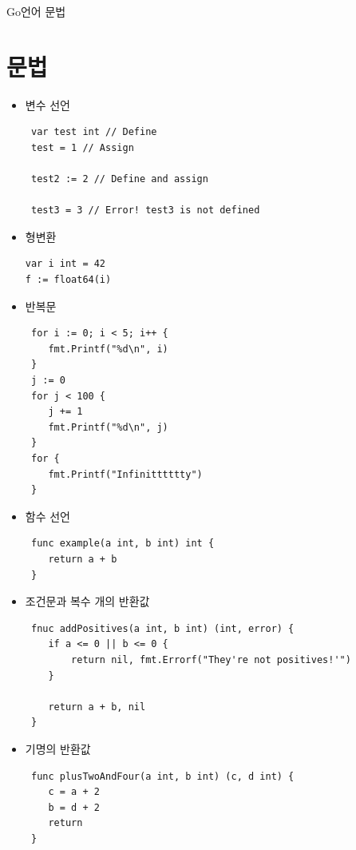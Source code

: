\documentclass{beamer}
\begin{document}
 \begin{frame}{Go언어 문법}
 \section{문법}
  \begin{itemize}
  \item 변수 선언
\begin{lstlisting}
 var test int // Define
 test = 1 // Assign

 test2 := 2 // Define and assign

 test3 = 3 // Error! test3 is not defined
\end{lstlisting}

    \item 형변환

    \begin{lstlisting}
var i int = 42
f := float64(i)
    \end{lstlisting}

    \framebreak

    \item 반복문
\begin{lstlisting}
 for i := 0; i < 5; i++ {
    fmt.Printf("%d\n", i)
 }
 j := 0
 for j < 100 {
    j += 1
    fmt.Printf("%d\n", j)
 }
 for {
    fmt.Printf("Infinitttttty")
 }
\end{lstlisting}

\framebreak

   \item 함수 선언
\begin{lstlisting}
 func example(a int, b int) int {
    return a + b
 }
\end{lstlisting}

    \item 조건문과 복수 개의 반환값
\begin{lstlisting}
 fnuc addPositives(a int, b int) (int, error) {
    if a <= 0 || b <= 0 {
        return nil, fmt.Errorf("They're not positives!'")
    }

    return a + b, nil
 }
\end{lstlisting}

    \framebreak

    \item 기명의 반환값

\begin{lstlisting}
 func plusTwoAndFour(a int, b int) (c, d int) {
    c = a + 2
    b = d + 2
    return
 }
\end{lstlisting}


\end{itemize}
\end{frame}
\end{document}
